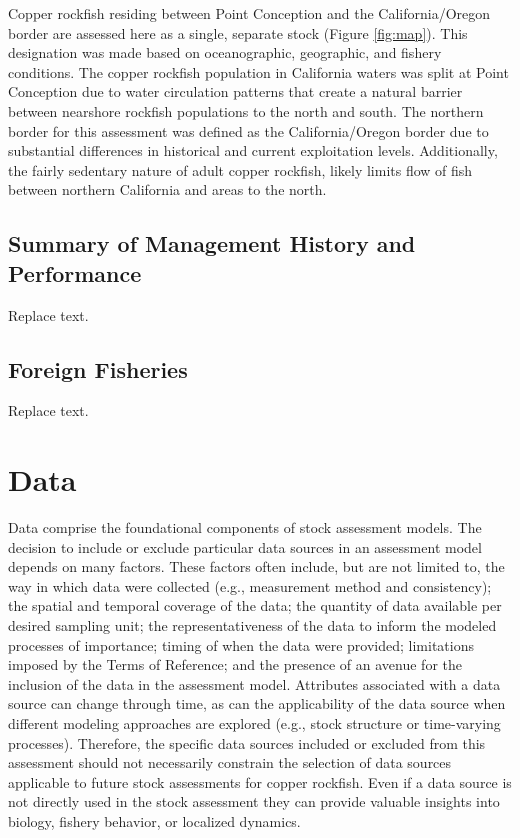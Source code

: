 \documentclass[11pt,
  english,
  letterpaper,
]{article}
\begin{document}
Copper rockfish residing between Point Conception and the California/Oregon border are assessed here as a single, separate stock (Figure \ref{fig:map}). This designation was made based on oceanographic, geographic, and fishery conditions. The copper rockfish population in California waters was split at Point Conception due to water circulation patterns that create a natural barrier between nearshore rockfish populations to the north and south. The northern border for this assessment was defined as the California/Oregon border due to substantial differences in historical and current exploitation levels. Additionally, the fairly sedentary nature of adult copper rockfish, likely limits flow of fish between northern California and areas to the north.

\hypertarget{summary-of-management-history-and-performance}{%
\subsection{Summary of Management History and Performance}\label{summary-of-management-history-and-performance}}

Replace text.

\hypertarget{foreign-fisheries}{%
\subsection{Foreign Fisheries}\label{foreign-fisheries}}

Replace text.

\hypertarget{data}{%
\section{Data}\label{data}}

Data comprise the foundational components of stock assessment models. The decision to include or exclude particular data sources in an assessment model depends on many factors. These factors often include, but are not limited to, the way in which data were collected (e.g., measurement method and consistency); the spatial and temporal coverage of the data; the quantity of data available per desired sampling unit; the representativeness of the data to inform the modeled processes of importance; timing of when the data were provided; limitations imposed by the Terms of Reference; and the presence of an avenue for the inclusion of the data in the assessment model. Attributes associated with a data source can change through time, as can the applicability of the data source when different modeling approaches are explored (e.g., stock structure or time-varying processes). Therefore, the specific data sources included or excluded from this assessment should not necessarily constrain the selection of data sources applicable to future stock assessments for copper rockfish. Even if a data source is not directly used in the stock assessment they can provide valuable insights into biology, fishery behavior, or localized dynamics.
\end{document}
